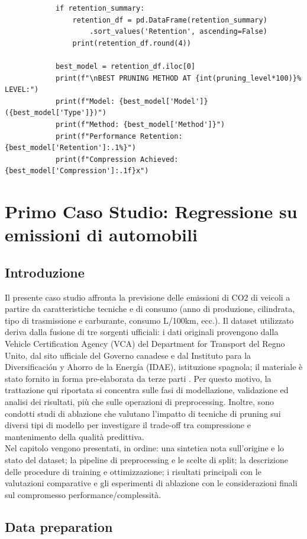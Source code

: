 \documentclass[a4paper,12pt]{report}
\begin{document}
\begin{verbatim}
			if retention_summary:
				retention_df = pd.DataFrame(retention_summary)
					.sort_values('Retention', ascending=False)
				print(retention_df.round(4))
		
			best_model = retention_df.iloc[0]
			print(f"\nBEST PRUNING METHOD AT {int(pruning_level*100)}% LEVEL:")
			print(f"Model: {best_model['Model']} ({best_model['Type']})")
			print(f"Method: {best_model['Method']}")
			print(f"Performance Retention: {best_model['Retention']:.1%}")
			print(f"Compression Achieved: {best_model['Compression']:.1f}x")
	\end{verbatim}
	
	\chapter{Primo Caso Studio: Regressione su emissioni di automobili}
	
	\section{Introduzione}
	Il presente caso studio affronta la previsione delle emissioni di CO2 di veicoli a partire da caratteristiche tecniche e di consumo (anno di produzione, cilindrata, tipo di trasmissione e carburante, consumo L/100km, ecc.). Il dataset utilizzato deriva dalla fusione di tre sorgenti ufficiali: i dati originali provengono dalla Vehicle Certification Agency (VCA) del Department for Transport del Regno Unito, dal sito ufficiale del Governo canadese e dal Instituto para la Diversificación y Ahorro de la Energía (IDAE), istituzione spagnola; il materiale è stato fornito in forma pre-elaborata da terze parti \cite{olivi2024car}. Per questo motivo, la trattazione qui riportata si concentra sulle fasi di modellazione, validazione ed analisi dei risultati, più che sulle operazioni di preprocessing. Inoltre, sono condotti studi di ablazione che valutano l’impatto di tecniche di pruning sui diversi tipi di modello per investigare il trade-off tra compressione e mantenimento della qualità predittiva. \\
	Nel capitolo vengono presentati, in ordine: una sintetica nota sull’origine e lo stato del dataset; la pipeline di preprocessing e le scelte di split; la descrizione delle procedure di training e ottimizzazione; i risultati principali con le valutazioni comparative e gli esperimenti di ablazione con le considerazioni finali sul compromesso performance/complessità.
	
	\section{Data preparation}
	
\end{document}

